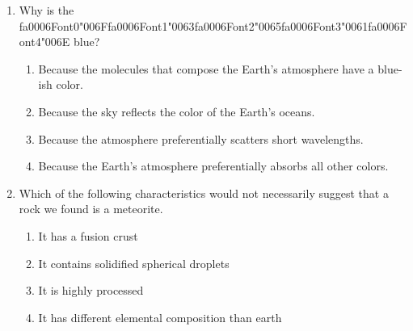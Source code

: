 \documentclass[12pt]{article}
\begin{document}
\begin{enumerate}[label=\arabic*.]
Which one is the second closest star(system)?
\begin{enumerate}[label=(\alph*)]
    \item Wolf 359
    \item Sirius
    \item 61 Cygni
    \item Barnard's Star
\end{enumerate}
\item Why is the {\csname fa0006Font0\endcsname\char"006F}{\csname fa0006Font1\endcsname\char"0063}{\csname fa0006Font2\endcsname\char"0065}{\csname fa0006Font3\endcsname\char"0061}{\csname fa0006Font4\endcsname\char"006E} blue?
\begin{enumerate}[label=(\alph*)]
    \item Because the molecules that compose the Earth's atmosphere have a blue-ish color.
    \item Because the sky reflects the color of the Earth's oceans.
    \item Because the atmosphere preferentially scatters short wavelengths.
    \item Because the Earth's atmosphere preferentially absorbs all other colors.
\end{enumerate}
\item Which of the following characteristics would not necessarily suggest that a rock we found
is a meteorite.
\begin{enumerate}[label=(\alph*)]
    \item It has a fusion crust
    \item It contains solidified spherical droplets
    \item It is highly processed
    \item It has different elemental composition than earth
\end{enumerate}
\end{enumerate}
\end{document}
